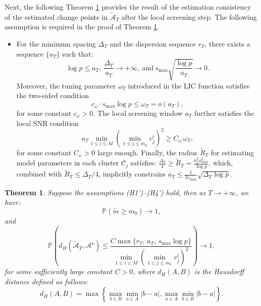 \documentclass[11pt]{article}
\newtheorem{theorem}{Theorem}
\begin{document}
Next, the following Theorem \ref{thm:2} provides the result of the estimation consistency of the estimated change points in $\widetilde{\mathcal{A}}_T$ after the local screening step. The following assumption is required in the proof of Theorem \ref{thm:2}. 
\begin{itemize}
    \item[(H4')] For the minimum spacing $\Delta_T$ and the dispersion sequence $r_T$, there exists a sequence $\{a_T\}$ such that:
    \begin{equation*}
        \log p \leq a_T,\ \frac{\Delta_T}{a_T} \to +\infty,\ \text{and}\ s_{\max}\sqrt{\frac{\log p}{a_T}} \to 0.
    \end{equation*}
    Moreover, the tuning parameter $\omega_T$ introduced in the LIC function satisfies the two-sided condition
    \begin{equation*}
        c_\omega \cdot s_{\max}\log p \leq \omega_T = o(a_T),
    \end{equation*}
    for some constant $c_\omega>0$. The local screening window $a_T$ further satisfies the local SNR condition
    \begin{equation*}
        a_T \min_{1\leq i \leq M}(\min_{1\leq j \leq m_0}v_j^i)^2 \geq C_\omega\,\omega_T,
    \end{equation*}
    for some constant $C_\omega>0$ large enough. Finally, the radius $\widetilde{R}_T$ for estimating model parameters in each cluster $\mathcal{C}_j$ satisfies: $\frac{\Delta_T}{4} \geq \widetilde{R}_T = \frac{a_T^2s_{\max}^2}{\log p}$, which, combined with $\widetilde{R}_T \leq \Delta_T/4$, implicitly constrains $a_T \leq \frac{1}{2s_{\max}}\sqrt{\Delta_T \log p}$.
\end{itemize}
\begin{theorem}
    \label{thm:2}
    Suppose the assumptions (H1')--(H4') hold, then as $T \to +\infty$, we have:
    \begin{equation*}
        \mathbb{P}\left( \widetilde{m} \geq m_0 \right) \to 1,
    \end{equation*}
    and
    \begin{equation*}
        \mathbb{P}\left( d_H(\widetilde{\mathcal{A}}_T, \mathcal{A}^\star) \leq \frac{C\max\{r_T,\,a_T,\,s_{\max}\log p\}}{\min_{1\leq i \leq M}(\min_{1\leq j \leq m_0}v_j^i)^2} \right) \to 1,
    \end{equation*}
    for some sufficiently large constant $C>0$, where $d_H(A,B)$ is the Hausdorff distance defined as follows:
    \begin{equation*}
        d_H(A, B) = \max\left\{ \max_{b\in B}\min_{a\in A}|b-a|, \max_{a\in A}\min_{b\in B}|b-a| \right\}.
    \end{equation*}
\end{theorem}
\end{document}
